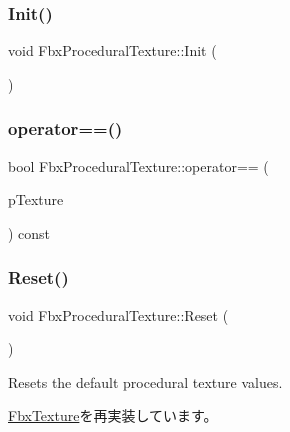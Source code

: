 \subsubsection{\texorpdfstring{Init()}{Init()}}
{\footnotesize\ttfamily void Fbx\+Procedural\+Texture\+::\+Init (\begin{DoxyParamCaption}{ }\end{DoxyParamCaption})\hspace{0.3cm}{\ttfamily [protected]}}

\mbox{\label{class_fbx_procedural_texture_a0687270beaf7354bec0e230bd85a61b7}} 
\subsubsection{\texorpdfstring{operator==()}{operator==()}}
{\footnotesize\ttfamily bool Fbx\+Procedural\+Texture\+::operator== (\begin{DoxyParamCaption}\item[{\hyperlink{class_fbx_procedural_texture}{Fbx\+Procedural\+Texture} const \&}]{p\+Texture }\end{DoxyParamCaption}) const}

\mbox{\label{class_fbx_procedural_texture_ad98e91a632bfbd9f29ee537cbe4ff180}} 
\subsubsection{\texorpdfstring{Reset()}{Reset()}}
{\footnotesize\ttfamily void Fbx\+Procedural\+Texture\+::\+Reset (\begin{DoxyParamCaption}{ }\end{DoxyParamCaption})\hspace{0.3cm}{\ttfamily [virtual]}}

Resets the default procedural texture values. 

\hyperlink{class_fbx_texture_a9ba254e02e13f1cae91295c996ed7fcb}{Fbx\+Texture}を再実装しています。

\mbox{\label{class_fbx_procedural_texture_a474dd437337ac1f76e7b9c77b7af45ee}} 
